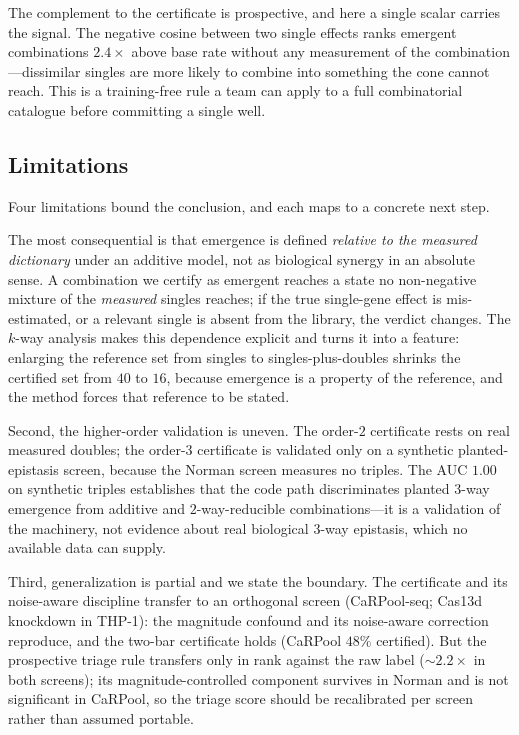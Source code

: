 The complement to the certificate is prospective, and here a single scalar carries the signal.
The negative cosine between two single effects ranks emergent combinations $2.4\times$ above base
rate without any measurement of the combination---dissimilar singles are more likely to combine
into something the cone cannot reach. This is a training-free rule a team can apply to a full
combinatorial catalogue before committing a single well.

\subsection{Limitations}
\label{sec:limitations}
Four limitations bound the conclusion, and each maps to a concrete next step.

The most consequential is that emergence is defined \emph{relative to the measured dictionary}
under an additive model, not as biological synergy in an absolute sense. A combination we certify
as emergent reaches a state no non-negative mixture of the \emph{measured} singles reaches; if the
true single-gene effect is mis-estimated, or a relevant single is absent from the library, the
verdict changes. The $k$-way analysis makes this dependence explicit and turns it into a feature:
enlarging the reference set from singles to singles-plus-doubles shrinks the certified set from
$40$ to $16$, because emergence is a property of the reference, and the method forces that
reference to be stated.

Second, the higher-order validation is uneven. The order-$2$ certificate rests on real measured
doubles; the order-$3$ certificate is validated only on a synthetic planted-epistasis screen,
because the Norman screen measures no triples. The AUC $1.00$ on synthetic triples establishes
that the code path discriminates planted $3$-way emergence from additive and $2$-way-reducible
combinations---it is a validation of the machinery, not evidence about real biological $3$-way
epistasis, which no available data can supply.

Third, generalization is partial and we state the boundary. The certificate and its noise-aware
discipline transfer to an orthogonal screen (CaRPool-seq; Cas13d knockdown in THP-1): the
magnitude confound and its noise-aware correction reproduce, and the two-bar certificate holds
(CaRPool $48\%$ certified). But the prospective triage rule transfers only in rank against the raw
label ($\sim\!2.2\times$ in both screens); its magnitude-controlled component survives in Norman
and is not significant in CaRPool, so the triage score should be recalibrated per screen rather
than assumed portable.

